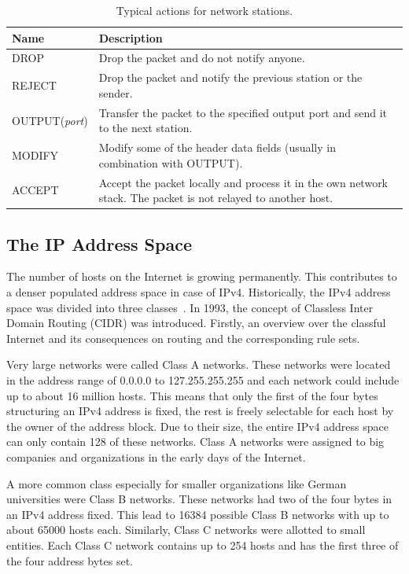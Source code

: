 \documentclass[a4paper,
		12pt,
		parskip=full,
		titlepage
		]{scrartcl}
\begin{document}
\begin{table}
  \centering
  \begin{tabularx}{\textwidth}{l|X}
  Name&Description\\
  \hline
  DROP&Drop the packet and do not notify anyone.\\
  REJECT&Drop the packet and notify the previous station or the sender.\\
  OUTPUT(\textit{port})&Transfer the packet to the specified output port and send it to the next station.\\
  MODIFY&Modify some of the header data fields (usually in combination with OUTPUT).\\
  ACCEPT&Accept the packet locally and process it in the own network stack. The packet is not relayed to another host.\\
  \end{tabularx}
  \caption{Typical actions for network stations.}
  \label{table:actions}
\end{table}

\subsection{The IP Address Space}
The number of hosts on the Internet is growing permanently.
This contributes to a denser populated address space in case of IPv4.
Historically, the IPv4 address space was divided into three classes~\cite{rfc1466}.
In 1993, the concept of Classless Inter Domain Routing (CIDR) was introduced.
Firstly, an overview over the classful Internet and its consequences on routing and the corresponding rule sets.

Very large networks were called Class A networks.
These networks were located in the address range of 0.0.0.0 to 127.255.255.255 and each network could include up to about 16 million hosts.
This means that only the first of the four bytes structuring an IPv4 address is fixed, the rest is freely selectable for each host by the owner of the address block.
Due to their size, the entire IPv4 address space can only contain 128 of these networks.
Class A networks were assigned to big companies and organizations in the early days of the Internet.

A more common class especially for smaller organizations like German universities were Class B networks.
These networks had two of the four bytes in an IPv4 address fixed.
This lead to 16384 possible Class B networks with up to about 65000 hosts each.
Similarly, Class C networks were allotted to small entities.
Each Class C network contains up to 254 hosts and has the first three of the four address bytes set.
\end{document}
